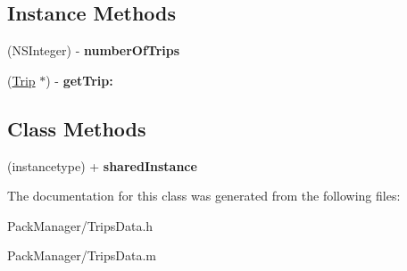 \subsection*{Instance Methods}
\begin{DoxyCompactItemize}
\item 
\hypertarget{interface_trips_data_aaad503ab67656b4e43ad6227fba6fc59}{(N\-S\-Integer) -\/ {\bfseries number\-Of\-Trips}}\label{interface_trips_data_aaad503ab67656b4e43ad6227fba6fc59}

\item 
\hypertarget{interface_trips_data_a433034d39dff68774a32958007ad5ff1}{(\hyperlink{interface_trip}{Trip} $\ast$) -\/ {\bfseries get\-Trip\-:}}\label{interface_trips_data_a433034d39dff68774a32958007ad5ff1}

\end{DoxyCompactItemize}
\subsection*{Class Methods}
\begin{DoxyCompactItemize}
\item 
\hypertarget{interface_trips_data_ac78fc79e8ebd10722f0b9f06df78eb27}{(instancetype) + {\bfseries shared\-Instance}}\label{interface_trips_data_ac78fc79e8ebd10722f0b9f06df78eb27}

\end{DoxyCompactItemize}


The documentation for this class was generated from the following files\-:\begin{DoxyCompactItemize}
\item 
Pack\-Manager/Trips\-Data.\-h\item 
Pack\-Manager/Trips\-Data.\-m\end{DoxyCompactItemize}
